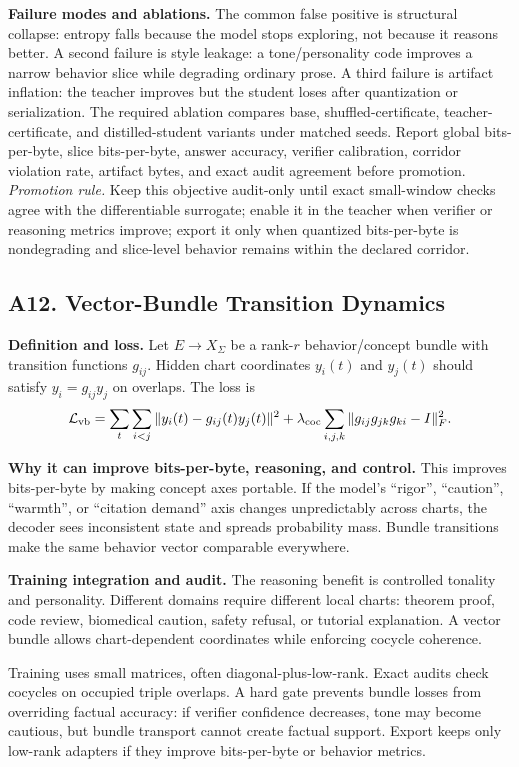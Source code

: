 \documentclass[10pt]{article}
\newcommand{\loss}{\mathcal{L}}
\numberwithin{equation}{section}
\begin{document}
\noindent\textbf{Failure modes and ablations.} The common false positive is structural collapse: entropy falls because the model stops exploring, not because it reasons better. A second failure is style leakage: a tone/personality code improves a narrow behavior slice while degrading ordinary prose. A third failure is artifact inflation: the teacher improves but the student loses after quantization or serialization. The required ablation compares base, shuffled-certificate, teacher-certificate, and distilled-student variants under matched seeds. Report global bits-per-byte, slice bits-per-byte, answer accuracy, verifier calibration, corridor violation rate, artifact bytes, and exact audit agreement before promotion.
\vfill
\noindent\emph{Promotion rule.} Keep this objective audit-only until exact small-window checks agree with the differentiable surrogate; enable it in the teacher when verifier or reasoning metrics improve; export it only when quantized bits-per-byte is nondegrading and slice-level behavior remains within the declared corridor.
\clearpage
\subsection{A12. Vector-Bundle Transition Dynamics}
\noindent\textbf{Definition and loss.} Let $E\to X_\Sigma$ be a rank-$r$ behavior/concept bundle with transition functions $g_{ij}$. Hidden chart coordinates $y_i(t)$ and $y_j(t)$ should satisfy $y_i=g_{ij}y_j$ on overlaps. The loss is
\[
\loss_{\rm vb}=\sum_t\sum_{i<j}\|y_i(t)-g_{ij}(t)y_j(t)\|^2+\lambda_{\rm coc}\sum_{i,j,k}\|g_{ij}g_{jk}g_{ki}-I\|_F^2.
\]

\noindent\textbf{Why it can improve bits-per-byte, reasoning, and control.} This improves bits-per-byte by making concept axes portable. If the model's ``rigor'', ``caution'', ``warmth'', or ``citation demand'' axis changes unpredictably across charts, the decoder sees inconsistent state and spreads probability mass. Bundle transitions make the same behavior vector comparable everywhere.

\noindent\textbf{Training integration and audit.} The reasoning benefit is controlled tonality and personality. Different domains require different local charts: theorem proof, code review, biomedical caution, safety refusal, or tutorial explanation. A vector bundle allows chart-dependent coordinates while enforcing cocycle coherence.

Training uses small matrices, often diagonal-plus-low-rank. Exact audits check cocycles on occupied triple overlaps. A hard gate prevents bundle losses from overriding factual accuracy: if verifier confidence decreases, tone may become cautious, but bundle transport cannot create factual support. Export keeps only low-rank adapters if they improve bits-per-byte or behavior metrics.
\end{document}
